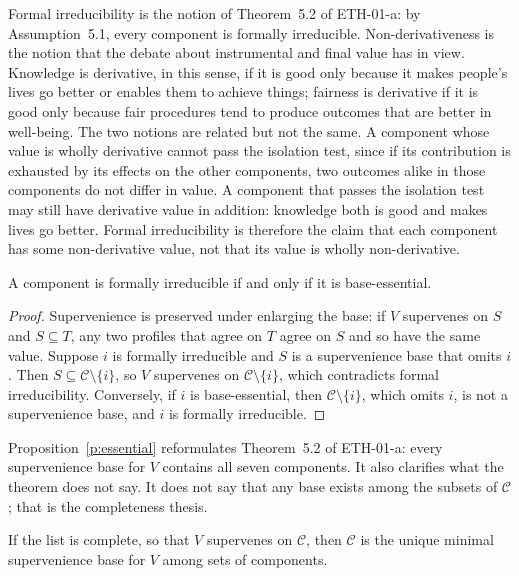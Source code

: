 \documentclass{situationist-preprint}
\begin{document}
Formal irreducibility is the notion of Theorem~5.2 of ETH-01-a: by Assumption~5.1, every component is formally irreducible. Non-derivativeness is the notion that the debate about instrumental and final value has in view. Knowledge is derivative, in this sense, if it is good only because it makes people's lives go better or enables them to achieve things; fairness is derivative if it is good only because fair procedures tend to produce outcomes that are better in well-being. The two notions are related but not the same. A component whose value is wholly derivative cannot pass the isolation test, since if its contribution is exhausted by its effects on the other components, two outcomes alike in those components do not differ in value. A component that passes the isolation test may still have derivative value in addition: knowledge both is good and makes lives go better. Formal irreducibility is therefore the claim that each component has some non-derivative value, not that its value is wholly non-derivative.

\begin{proposition}\label{p:essential}
A component is formally irreducible if and only if it is base-essential.
\end{proposition}

\begin{proof}
Supervenience is preserved under enlarging the base: if $V$ supervenes on $S$ and $S \subseteq T$, any two profiles that agree on $T$ agree on $S$ and so have the same value. Suppose $i$ is formally irreducible and $S$ is a supervenience base that omits $i$. Then $S \subseteq \mathcal{C}\setminus\{i\}$, so $V$ supervenes on $\mathcal{C}\setminus\{i\}$, which contradicts formal irreducibility. Conversely, if $i$ is base-essential, then $\mathcal{C}\setminus\{i\}$, which omits $i$, is not a supervenience base, and $i$ is formally irreducible.
\end{proof}

Proposition~\ref{p:essential} reformulates Theorem~5.2 of ETH-01-a: every supervenience base for $V$ contains all seven components. It also clarifies what the theorem does not say. It does not say that any base exists among the subsets of $\mathcal{C}$; that is the completeness thesis.

\begin{corollary}\label{c:unique}
If the list is complete, so that $V$ supervenes on $\mathcal{C}$, then $\mathcal{C}$ is the unique minimal supervenience base for $V$ among sets of components.
\end{corollary}
\end{document}
